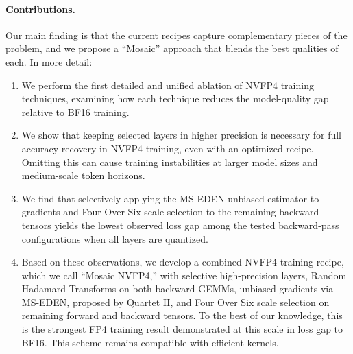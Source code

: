 \paragraph{Contributions.}
Our main finding is that the current recipes capture complementary pieces of the problem, and we propose a ``Mosaic'' approach that blends the best qualities of each. In more detail:
\begin{enumerate}
    \item We perform the first detailed and unified ablation of NVFP4 training techniques, examining how each technique reduces the model-quality gap relative to BF16 training.  
    \item  
    We show that keeping selected layers in higher precision is necessary for    
  full accuracy recovery in NVFP4 training, even with an optimized recipe. Omitting this can cause training instabilities at larger model sizes and medium-scale token horizons.    
    \item 
     We find that selectively applying the MS-EDEN \citep{panferov2026quartetii} unbiased estimator to gradients and Four Over Six \citep{cook2025fouroversix} scale selection to the remaining backward tensors yields the lowest observed loss gap among the tested backward-pass configurations when all layers are quantized.
    \item 
    Based on these observations, we develop a combined NVFP4 training recipe, which we call ``Mosaic NVFP4,'' with selective high-precision layers, Random Hadamard Transforms on both backward GEMMs, unbiased gradients via MS-EDEN, proposed by Quartet II, and Four Over Six scale selection on remaining forward and backward tensors. To the best of our knowledge, this is the strongest FP4 training result demonstrated at this scale in loss gap to BF16. This scheme remains compatible with efficient kernels. 
\end{enumerate}

